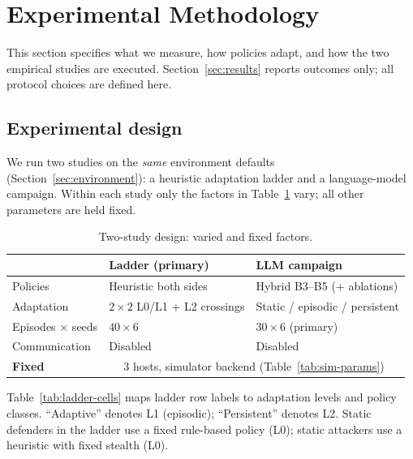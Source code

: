 \section{Experimental Methodology}
\label{sec:method}

This section specifies what we measure, how policies adapt, and how the
two empirical studies are executed. Section~\ref{sec:results} reports
outcomes only; all protocol choices are defined here.

\subsection{Experimental design}
\label{sec:method-design}

We run two studies on the \emph{same} environment defaults
(Section~\ref{sec:environment}): a heuristic adaptation ladder and a
language-model campaign. Within each study only the factors in
Table~\ref{tab:design} vary; all other parameters are held fixed.

\begin{table}[!t]
\caption{Two-study design: varied and fixed factors.}
\label{tab:design}
\centering
\setlength{\tabcolsep}{3pt}
\small
\begin{tabularx}{\columnwidth}{@{}lXX@{}}
\toprule
 & \textbf{Ladder (primary)} & \textbf{LLM campaign} \\
\midrule
Policies & Heuristic both sides & Hybrid B3--B5 (+ ablations) \\
Adaptation & $2{\times}2$ L0/L1 + L2 crossings & Static / episodic / persistent \\
Episodes $\times$ seeds & $40 \times 6$ & $30 \times 6$ (primary) \\
Communication & Disabled & Disabled \\
\midrule
\textbf{Fixed} & \multicolumn{2}{c}{3 hosts, simulator backend (Table~\ref{tab:sim-params})} \\
\bottomrule
\end{tabularx}
\end{table}

Table~\ref{tab:ladder-cells} maps ladder row labels to adaptation levels and
policy classes. ``Adaptive'' denotes L1 (episodic); ``Persistent'' denotes L2.
Static defenders in the ladder use a fixed rule-based policy (L0); static
attackers use a heuristic with fixed stealth (L0).

